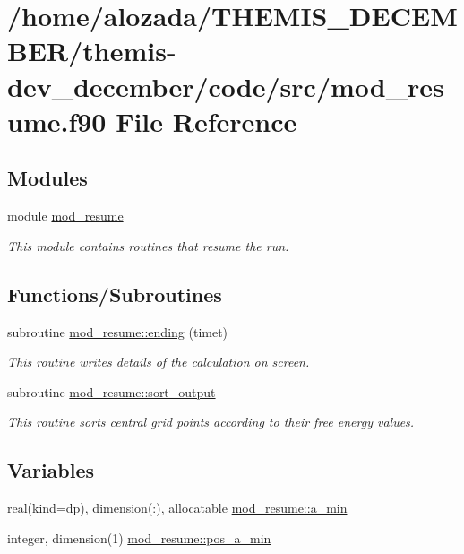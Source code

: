 \hypertarget{mod__resume_8f90}{}\section{/home/alozada/\+T\+H\+E\+M\+I\+S\+\_\+\+D\+E\+C\+E\+M\+B\+E\+R/themis-\/dev\+\_\+december/code/src/mod\+\_\+resume.f90 File Reference}
\label{mod__resume_8f90}
\subsection*{Modules}
\begin{DoxyCompactItemize}
\item 
module \hyperlink{namespacemod__resume}{mod\+\_\+resume}
\begin{DoxyCompactList}\small\item\em This module contains routines that resume the run. \end{DoxyCompactList}\end{DoxyCompactItemize}
\subsection*{Functions/\+Subroutines}
\begin{DoxyCompactItemize}
\item 
subroutine \hyperlink{namespacemod__resume_a74e0ed44fafff381d91477160c6d8a74}{mod\+\_\+resume\+::ending} (timet)
\begin{DoxyCompactList}\small\item\em This routine writes details of the calculation on screen. \end{DoxyCompactList}\item 
subroutine \hyperlink{namespacemod__resume_a36133bfde88e19b38e5d5245c89843fe}{mod\+\_\+resume\+::sort\+\_\+output}
\begin{DoxyCompactList}\small\item\em This routine sorts central grid points according to their free energy values. \end{DoxyCompactList}\end{DoxyCompactItemize}
\subsection*{Variables}
\begin{DoxyCompactItemize}
\item 
real(kind=dp), dimension(\+:), allocatable \hyperlink{namespacemod__resume_ad3cf0f0162ccc00d0efebb0348fe6ae5}{mod\+\_\+resume\+::a\+\_\+min}
\item 
integer, dimension(1) \hyperlink{namespacemod__resume_a2861e2f353be05850b4ad384446859c6}{mod\+\_\+resume\+::pos\+\_\+a\+\_\+min}
\end{DoxyCompactItemize}
